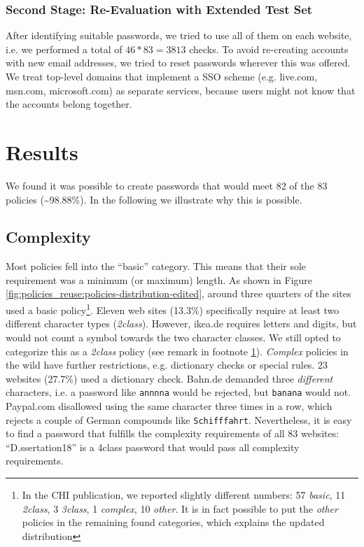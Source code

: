 \subsubsection{Second Stage: Re-Evaluation with Extended Test Set} After identifying suitable passwords, we tried to use all of them on each website, i.e. we performed a total of $46*83=3813$ checks. To avoid re-creating accounts with new email addresses, we tried to reset passwords wherever this was offered. 
We treat top-level domains that implement a \acrlong{SSO} scheme (e.g. live.com, msn.com, microsoft.com) as separate services, because users might not know that the accounts belong together. 


\section{Results}
We found it was possible to create passwords that would meet 82 of the 83 policies (\textasciitilde98.88\%). In the following we illustrate why this is possible. 

\subsection{Complexity}
Most policies fell into the ``basic'' category. This means that their sole requirement was a minimum (or maximum) length. As shown in Figure \ref{fig:policies_reuse:policies-distribution-edited}, around three quarters of the sites used a basic policy\footnote{\label{foot:policies_reuse:chi-publication-inconsistency}In the CHI publication, we reported slightly different numbers: 57 \textit{basic}, 11 \textit{2class}, 3 \textit{3class}, 1 \textit{complex}, 10 \textit{other}. It is in fact possible to put the \textit{other} policies in the remaining found categories, which explains the updated distribution}. 
Eleven web sites (13.3\%) specifically require at least two different character types (\textit{2class}). However, ikea.de requires letters and digits, but would not count a symbol towards the two character classes. We still opted to categorize this as a \textit{2class} policy (see remark in footnote \ref{foot:policies_reuse:chi-publication-inconsistency}). \textit{Complex} policies in the wild have further restrictions, e.g. dictionary checks or special rules. 23 websites (27.7\%) used a dictionary check. Bahn.de demanded three \textit{different} characters, i.e. a password like \texttt{annnna} would be rejected, but \texttt{banana} would not. Paypal.com disallowed using the same character three times in a row, which rejects a couple of German compounds like \texttt{Schifffahrt}. Nevertheless, it is easy to find a password that fulfills the complexity requirements of all 83 websites: ``D.ssertation18'' is a 4class password that would pass all complexity requirements. 

